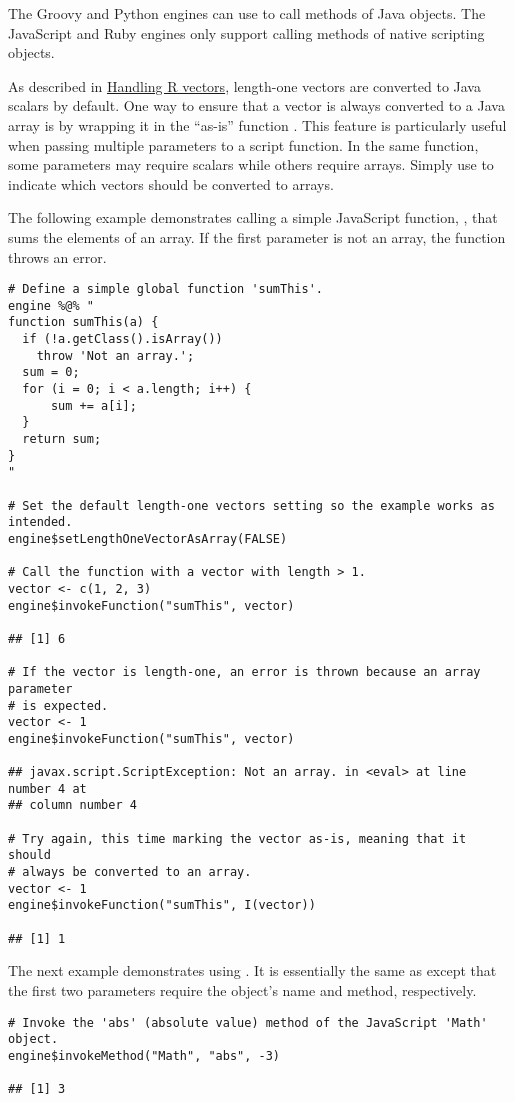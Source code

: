  The Groovy and Python engines can use  to call methods of Java objects. The JavaScript and Ruby engines only support calling methods of native scripting objects.

As described in \hyperlink{handlingrvectors}{Handling R vectors}, length-one vectors are converted to Java scalars by default. One way to ensure that a vector is always converted to a Java array is by wrapping it in the ``as-is'' function . This feature is particularly useful when passing multiple parameters to a script function. In the same function, some parameters may require scalars while others require arrays. Simply use  to indicate which vectors should be converted to arrays.

The following example demonstrates calling a simple JavaScript function, , that sums the elements of an array. If the first parameter is not an array, the function throws an error.

\begin{verbatim}
# Define a simple global function 'sumThis'.
engine %@% "
function sumThis(a) {
  if (!a.getClass().isArray())
    throw 'Not an array.';
  sum = 0;
  for (i = 0; i < a.length; i++) { 
      sum += a[i];
  }  
  return sum;
}
"

# Set the default length-one vectors setting so the example works as intended.
engine$setLengthOneVectorAsArray(FALSE)

# Call the function with a vector with length > 1.
vector <- c(1, 2, 3)
engine$invokeFunction("sumThis", vector)

## [1] 6

# If the vector is length-one, an error is thrown because an array parameter
# is expected.
vector <- 1
engine$invokeFunction("sumThis", vector)

## javax.script.ScriptException: Not an array. in <eval> at line number 4 at
## column number 4

# Try again, this time marking the vector as-is, meaning that it should 
# always be converted to an array.
vector <- 1
engine$invokeFunction("sumThis", I(vector))

## [1] 1
\end{verbatim}

The next example demonstrates using . It is essentially the same as  except that the first two parameters require the object's name and method, respectively.

\begin{verbatim}
# Invoke the 'abs' (absolute value) method of the JavaScript 'Math' object.
engine$invokeMethod("Math", "abs", -3)

## [1] 3
\end{verbatim}

